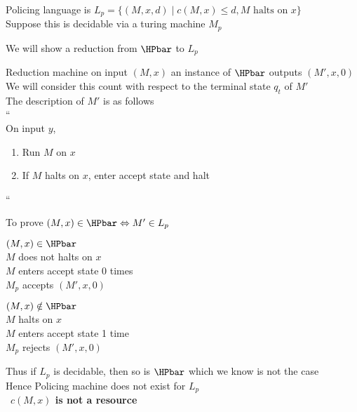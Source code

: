 Policing language is $L_p = \{ 
    (M, x, d) \mid c(M, x) \leq d, M \text{ halts on $x$}
\}$\\
Suppose this is decidable via a turing machine $M_p$

We will show a reduction from $\HPbar$ to $L_p$

Reduction machine on input $(M, x)$ an instance of $\HPbar$ outputs $(M', x, 0)$
We will consider this count with respect to the terminal state $q_t$ of $M'$\\
The description of $M'$ is as follows\\
``\\
On input $y$,
\begin{enumerate}
    \item Run $M$ on $x$
    \item If $M$ halts on $x$, enter accept state and halt
\end{enumerate}
``

To prove $(M, x) \in \HPbar \Leftrightarrow M' \in L_p$

$(M, x) \in \HPbar$\\
\imp
$M$ does not halts on $x$\\
\imp
$M$ enters accept state 0 times\\
\imp
$M_p$ accepts $(M', x, 0)$

$(M, x) \notin \HPbar$\\
\imp
$M$ halts on $x$\\
\imp
$M$ enters accept state 1 time\\
\imp
$M_p$ rejects $(M', x, 0)$

Thus if $L_p$ is decidable, then so is $\HPbar$ which we know is not the case\\
Hence Policing machine does not exist for $L_p$\\
\imp\
\textbf{$c(M, x)$ is not a resource}











